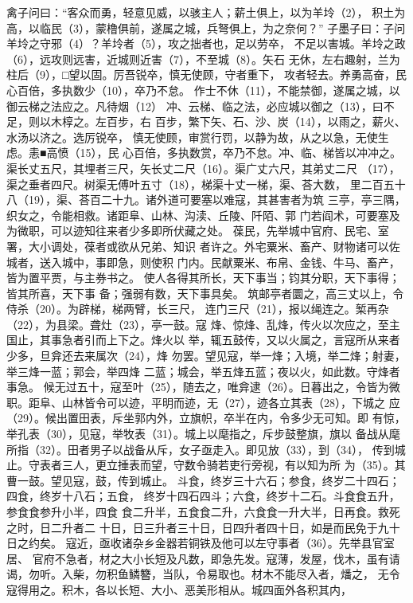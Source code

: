 \documentclass[12pt,UTF8]{ctexbook}
\begin{document}
禽子问曰：“客众而勇，轻意见威，以骇主人；薪土俱上，以为羊坽（2）， 
积土为高，以临民（3），蒙橹俱前，遂属之城，兵弩俱上，为之奈何？” 
子墨子曰：子问羊坽之守邪（4）？羊坽者（5），攻之拙者也，足以劳卒， 
不足以害城。羊坽之政（6），远攻则远害，近城则近害（7），不至城（8）。矢石 
无休，左右趣射，兰为柱后（9），□望以固。厉吾锐卒，慎无使顾，守者重下， 
攻者轻去。养勇高奋，民心百倍，多执数少（10），卒乃不怠。 
作士不休（11），不能禁御，遂属之城，以御云梯之法应之。凡待烟（12） 
冲、云梯、临之法，必应城以御之（13），曰不足，则以木椁之。左百步，右 
百步，繁下矢、石、沙、炭（14），以雨之，薪火、水汤以济之。选厉锐卒， 
慎无使顾，审赏行罚，以静为故，从之以急，无使生虑。恚■高愤（15），民 
心百倍，多执数赏，卒乃不怠。冲、临、梯皆以冲冲之。 
渠长丈五尺，其埋者三尺，矢长丈二尺（16）。渠广丈六尺，其弟丈二尺 
（17），渠之垂者四尺。树渠无傅叶五寸（18），梯渠十丈一梯，渠、荅大数， 
里二百五十八（19），渠、荅百二十九。诸外道可要塞以难寇，其甚害者为筑 
三亭，亭三隅，织女之，令能相救。诸距阜、山林、沟渎、丘陵、阡陌、郭 
门若阎术，可要塞及为微职，可以迹知往来者少多即所伏藏之处。 
葆民，先举城中官府、民宅、室署，大小调处，葆者或欲从兄弟、知识 
者许之。外宅粟米、畜产、财物诸可以佐城者，送入城中，事即急，则使积 
门内。民献粟米、布帛、金钱、牛马、畜产，皆为置平贾，与主券书之。 
使人各得其所长，天下事当；钧其分职，天下事得；皆其所喜，天下事 
备；强弱有数，天下事具矣。 
筑邮亭者圜之，高三丈以上，令侍杀（20）。为辟梯，梯两臂，长三尺， 
连门三尺（21），报以绳连之。椠再杂（22），为县梁。聋灶（23），亭一鼓。寇 
烽、惊烽、乱烽，传火以次应之，至主国止，其事急者引而上下之。烽火以 
举，辄五鼓传，又以火属之，言寇所从来者少多，旦弇还去来属次（24），烽 
勿罢。望见寇，举一烽；入境，举二烽；射妻，举三烽一蓝；郭会，举四烽 
二蓝；城会，举五烽五蓝；夜以火，如此数。守烽者事急。 
候无过五十，寇至叶（25），随去之，唯弇逮（26）。日暮出之，令皆为微 
职。距阜、山林皆令可以迹，平明而迹，无（27），迹各立其表（28），下城之 
应（29）。候出置田表，斥坐郭内外，立旗帜，卒半在内，令多少无可知。即 
有惊，举孔表（30），见寇，举牧表（31）。城上以麾指之，斥步鼓整旗，旗以 
备战从麾所指（32）。田者男子以战备从斥，女子亟走入。即见放（33），到（34）， 
传到城止。守表者三人，更立捶表而望，守数令骑若吏行旁视，有以知为所 
为（35）。其曹一鼓。望见寇，鼓，传到城止。 
斗食，终岁三十六石；参食，终岁二十四石；四食，终岁十八石；五食， 
终岁十四石四斗；六食，终岁十二石。斗食食五升，参食食参升小半，四食 
食二升半，五食食二升，六食食一升大半，日再食。救死之时，日二升者二 
十日，日三升者三十日，日四升者四十日，如是而民免于九十日之约矣。 
寇近，亟收诸杂乡金器若铜铁及他可以左守事者（36）。先举县官室居、 
官府不急者，材之大小长短及凡数，即急先发。寇薄，发屋，伐木，虽有请 
谒，勿听。入柴，勿积鱼鳞簪，当队，令易取也。材木不能尽入者，燔之， 
无令寇得用之。积木，各以长短、大小、恶美形相从。城四面外各积其内， 
\end{document}

